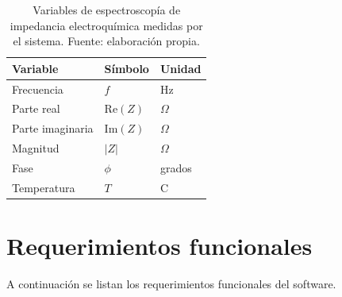 \documentclass[11pt,a4paper,spanish]{book}
\begin{document}
\begin{table}[h]
	\centering
	\begin{tabular}{l l l}
		\hline\hline
		Variable & S\'{i}mbolo & Unidad \\ [0.5ex]
		\hline
		Frecuencia          & $f$              & Hz \\
		Parte real           & $\mathrm{Re}(Z)$ & $\Omega$ \\
		Parte imaginaria     & $\mathrm{Im}(Z)$ & $\Omega$ \\
		Magnitud             & $|Z|$            & $\Omega$ \\
		Fase                 & $\phi$           & grados \\
		Temperatura          & $T$              & \textdegree C \\
		\hline
	\end{tabular}
	\caption[Variables EIS del sistema]{Variables de espectroscop\'{i}a de impedancia electroqu\'{i}mica medidas por el sistema. Fuente: elaboraci\'{o}n propia.}
	\label{tab:variables}
\end{table}


\chapter{Requerimientos funcionales}

A continuaci\'{o}n se listan los requerimientos funcionales del software.
\end{document}
